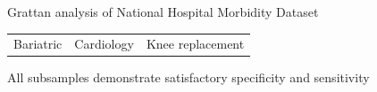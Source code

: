 \documentclass[submission]{grattan}
\begin{document}
\begin{figure}
\begin{tabularx}{\linewidth}{@{}C@{}C@{}C@{}}
\end{tabularx}
%
{Grattan analysis of National Hospital Morbidity Dataset}
\end{figure}

\begin{figure}
\caption{All subsamples demonstrate satisfactory specificity and sensitivity}\label{fig:all-subsamples-satisfactory-specificity-sensitivity}
\begin{tabularx}{\linewidth}{@{}C@{}C@{}C@{}}
Bariatric & Cardiology & Knee replacement \\
\cmidrule(lr){1-1}\cmidrule(lr){2-2}\cmidrule(lr){3-3}

\end{tabularx}
\end{figure}
\end{document}
